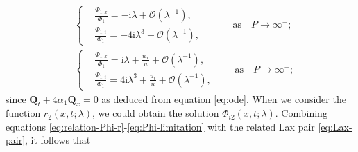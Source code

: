 \documentclass[11pt,reqno]{amsart}
\newcommand{\ii}{\mathrm{i}}
\numberwithin{equation}{section}
\begin{document}
\begin{equation}\label{eq:Phi-limitation}
	\begin{split}
		&
		\left\{ \begin{aligned}
			&\frac{\Phi_{1,x}}{\Phi_{1}} = - \ii \lambda+ \mathcal{O}(\lambda^{-1}),\\
			&\frac{\Phi_{1,t}}{\Phi_{1}} = - 4\ii\lambda^3+ \mathcal{O}(\lambda^{-1}),
		\end{aligned}\right.  \quad \qquad \text{as} \quad  P \rightarrow \infty^{-};\\
		&
		\left\{ \begin{aligned}
			&\frac{\Phi_{1,x}}{\Phi_{1}} = \ii \lambda+\frac{u_x}{u}+ \mathcal{O}(\lambda^{-1}), \\
			&\frac{\Phi_{1,t}}{\Phi_{1}} = 4\ii\lambda^3+\frac{u_t}{u}+ \mathcal{O}(\lambda^{-1}),
		\end{aligned} \right. \qquad \text{as}  \quad P \rightarrow \infty^{+};
	\end{split}
\end{equation} 
since $\mathbf{Q}_t+4\alpha_1\mathbf{Q}_x=0$ as deduced from  equation \eqref{eq:ode}.
When we consider the function $r_2(x,t;\lambda)$, we could obtain the solution $\Phi_{i2}(x,t;\lambda)$.
Combining equations \eqref{eq:relation-Phi-r}-\eqref{eq:Phi-limitation} with the related Lax pair \eqref{eq:Lax-pair}, it follows that
\end{document}
